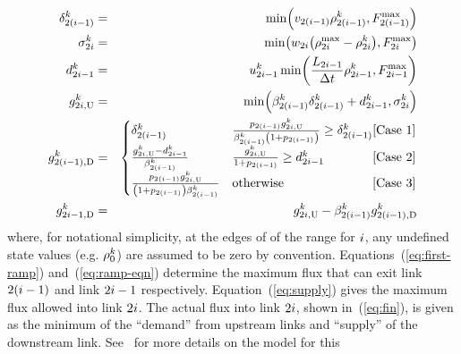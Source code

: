 \begin{eqnarray}
\demand_{2\left(\link-1\right)}^{\tind} & = & \min\left(\ffspeed_{2\left(i-1\right)}\densitydiscrete{2\left(\link-1\right)}{\tind},F_{2\left(\link-1\right)}^{\max}\right)\label{eq:first-ramp}\\
\supply_{2\link}^{\tind} & = & \min\left(\congspeed_{2i}\left(\density_{2i}^{\max}-\densitydiscrete{2\link}{\tind}\right),F_{2i}^{\max}\right)\label{eq:supply}\\
\rampDemand_{2\link-1}^{\tind} & = & \ramp_{2\link-1}^{\tind}\min\left(\frac{\length_{2\link-1}}{\Delta t}\densitydiscrete{2\link-1}{\tind},F_{2i-1}^{\max}\right)\label{eq:ramp-eqn}\\
\fin{2\link}{\tind} & = & \min\left(\splitratio_{2\left(\link-1\right)}^{\tind}\demand_{2\left(\link-1\right)}^{\tind}+\rampDemand_{2\link-1}^{\tind},\supply_{2\link}^{\tind}\right)\label{eq:fin}\\
\fout{2\left(\link-1\right)}{\tind} & = & \begin{cases}
\demand_{2\left(\link-1\right)}^{\tind} & \frac{p_{2(\link-1)}\fin{2\link}{\tind}}{\splitratio_{2\left(\link-1\right)}^{\tind}\left(1+p_{2(\link-1)}\right)}\ge\demand_{2\left(\link-1\right)}^{\tind}\hfill\text{[Case 1]}\\
\frac{\fin{2\link}{\tind}-\rampDemand_{2\link-1}^{\tind}}{\splitratio_{2\left(\link-1\right)}^{\tind}} & \frac{\fin{2\link}{\tind}}{1+p_{2(\link-1)}}\ge\rampDemand_{2\link-1}^{\tind}\hfill\text{[Case 2}]\\
\frac{p_{2(\link-1)}\fin{2\link}{\tind}}{\left(1+p_{2(\link-1)}\right)\splitratio_{2\left(\link-1\right)}^{\tind}} & \text{otherwise}\hfill[\text{Case 3]}
\end{cases}\label{eq:merge}\\
\fout{2\link-1}{\tind} & = & \fin{2\link}{\tind}-\splitratio_{2\left(\link-1\right)}^{\tind}\fout{2\left(\link-1\right)}{\tind}\label{eq:last-ramp}
\end{eqnarray}
where, for notational simplicity, at the edges of of the range for
$i$, any undefined state values (e.g. $\rho_{0}^{k}$)
are assumed to be zero by convention. Equations~(\ref{eq:first-ramp})
and~(\ref{eq:ramp-eqn}) determine the maximum flux that can exit
link $2(i-1)$ and link $2i-1$ respectively. Equation~(\ref{eq:supply})
gives the maximum flux allowed into link $2i$. The actual flux
into link $2i$, shown in~(\ref{eq:fin}), is given as the minimum
of the ``demand'' from upstream links and ``supply'' of the downstream
link. See~\cite{Monache2013} for more details on the model for this
